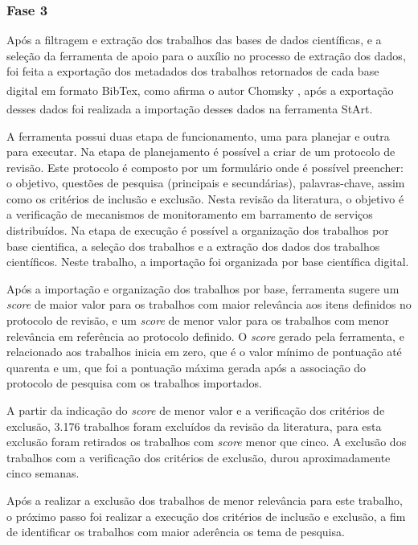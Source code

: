 \subsubsection{Fase 3} Após a filtragem e extração dos trabalhos das bases de dados científicas, e a seleção da ferramenta de apoio para o auxílio no processo de extração dos dados, foi feita a exportação dos metadados dos trabalhos retornados de cada base digital em formato BibTex\textsuperscript{\textregistered}, como afirma o autor Chomsky \cite{chomsky1969linguistica}, após a exportação desses dados foi realizada a importação desses dados na ferramenta \acrshort{StArt}\textsuperscript{\textregistered}. 

A ferramenta possui duas etapa de funcionamento, uma para planejar e outra para executar. Na etapa de planejamento é possível a criar de um protocolo de revisão. Este protocolo é composto por um formulário onde é possível preencher: o objetivo, questões de pesquisa (principais e secundárias), palavras-chave, assim como os critérios de inclusão e exclusão. Nesta revisão da literatura, o objetivo é a verificação de mecanismos de monitoramento em barramento de serviços distribuídos. Na etapa de execução é possível a organização dos trabalhos por base cientifica, a seleção dos trabalhos e a extração dos dados dos trabalhos científicos. Neste trabalho, a importação foi organizada por base científica digital. 

Após a importação e organização dos trabalhos por base, ferramenta sugere um \textit{score} de maior valor para os trabalhos com maior relevância aos itens definidos no protocolo de revisão, e um \textit{score} de menor valor para os trabalhos com menor relevância em referência ao protocolo definido. O \textit{score} gerado pela ferramenta, e relacionado aos trabalhos inicia em zero, que é o valor mínimo de pontuação até quarenta e um, que foi a pontuação máxima gerada após a associação do protocolo de pesquisa com os trabalhos importados. 

A partir da indicação do \textit{score} de menor valor e a verificação dos critérios de exclusão, 3.176 trabalhos foram excluídos da revisão da literatura, para esta exclusão foram retirados os trabalhos com \textit{score} menor que cinco. A exclusão dos trabalhos com a verificação dos critérios de exclusão, durou aproximadamente cinco semanas. 

Após a realizar a exclusão dos trabalhos de menor relevância para este trabalho, o próximo passo foi realizar a execução dos critérios de inclusão e exclusão, a fim de identificar os trabalhos com maior aderência os tema de pesquisa. 

